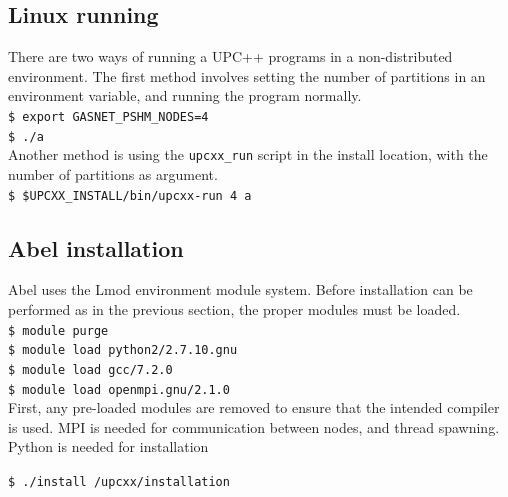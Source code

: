 \documentclass{uit-report}
\begin{document}
\subsection{Linux running}
There are two ways of running a UPC++ programs in a non-distributed environment. The first method involves setting the number of partitions in an environment variable, and running the program normally.\\
\phantom{11111} \texttt{\$ export GASNET\_PSHM\_NODES=4}\\
\phantom{11111} \texttt{\$ ./a}\\

Another method is using the \texttt{upcxx\_run} script in the install location, with the number of partitions as argument.\\
\phantom{11111} \texttt{\$ \$UPCXX\_INSTALL/bin/upcxx-run 4 a}\\
\subsection{Abel installation}
Abel uses the Lmod environment module system. Before installation can be performed as in the previous section, the proper modules must be loaded. \\
\phantom{11111} \texttt{\$ module purge}\\
\phantom{11111} \texttt{\$ module load python2/2.7.10.gnu}\\
\phantom{11111} \texttt{\$ module load gcc/7.2.0}\\
\phantom{11111} \texttt{\$ module load openmpi.gnu/2.1.0}  \\
First, any pre-loaded modules are removed to ensure that the intended compiler is used. MPI is needed for communication between nodes, and thread spawning. Python is needed for installation 

\phantom{11111} \texttt{\$ ./install /upcxx/installation} \\
\end{document}
